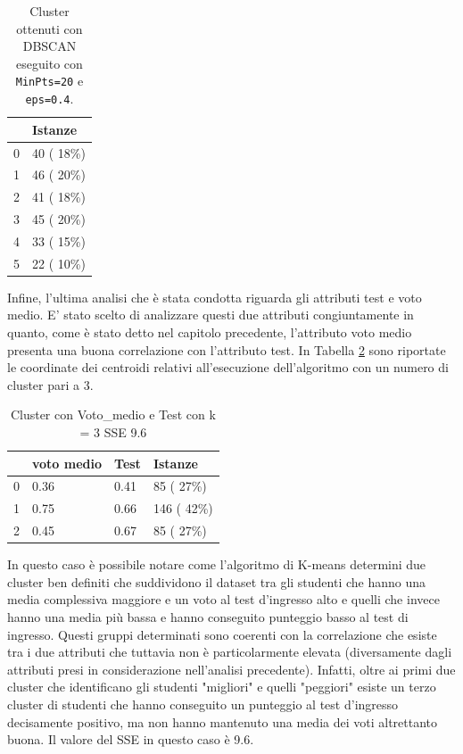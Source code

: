 \documentclass[12pt]{article}
\begin{document}
\begin{table}[H]
\centering
\begin{tabular}{l|l|}
\cline{2-2}
                        & Istanze    \\ \hline
\multicolumn{1}{|l|}{0} & 40 ( 18\%) \\ \hline
\multicolumn{1}{|l|}{1} & 46 ( 20\%) \\ \hline
\multicolumn{1}{|l|}{2} & 41 ( 18\%) \\ \hline
\multicolumn{1}{|l|}{3} & 45 ( 20\%) \\ \hline
\multicolumn{1}{|l|}{4} & 33 ( 15\%) \\ \hline
\multicolumn{1}{|l|}{5} & 22 ( 10\%) \\ \hline
\end{tabular}
\caption{Cluster ottenuti con DBSCAN eseguito con \texttt{MinPts=20} e \texttt{eps=0.4}.}
\label{tab:dbscan2004}
\end{table}

Infine, l'ultima analisi che è stata condotta riguarda gli attributi test e voto medio. E' stato scelto di analizzare 
questi due attributi congiuntamente in quanto, come è stato detto nel capitolo precedente, l'attributo voto medio 
presenta una buona correlazione con l'attributo test. 
In Tabella \ref{c3MT} sono riportate le coordinate dei centroidi relativi all'esecuzione dell'algoritmo con un numero di cluster pari a 3.
\begin{table}[ht]
	\centering
	\begin{tabular}{@{}llll@{}}
	\toprule
	  & voto medio & Test  & Istanze\\ \midrule
	0 & 0.36       & 0.41  & 85  ( 27\%)\\
	1 & 0.75       & 0.66  & 146 ( 42\%)\\
	2 & 0.45       & 0.67  & 85  ( 27\%)\\ \bottomrule
	\end{tabular}
	\caption{Cluster con Voto\_medio e Test con k = 3 SSE 9.6}
	\label{c3MT}
\end{table}
In questo caso è possibile notare come
l'algoritmo di K-means determini due cluster ben definiti che suddividono il dataset tra gli studenti che hanno una
media complessiva maggiore e un voto al test d'ingresso alto e quelli che invece hanno una media più bassa e 
hanno conseguito punteggio basso al test di ingresso. Questi gruppi determinati sono coerenti con la correlazione 
che esiste tra i due attributi che tuttavia non è particolarmente elevata (diversamente dagli attributi presi in 
considerazione nell'analisi precedente). Infatti, oltre ai primi due cluster che identificano gli studenti "migliori"
e quelli "peggiori" esiste un terzo cluster di studenti che hanno conseguito un punteggio al test d'ingresso decisamente
positivo, ma non hanno mantenuto una media dei voti altrettanto buona. Il valore del SSE in questo caso è 9.6.
\end{document}
